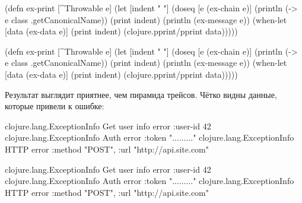 \ifx\DEVICETYPE\MOBILE

\begin{english}
  \begin{clojure}
(defn ex-print
  [^Throwable e]
  (let [indent "  "]
    (doseq [e (ex-chain e)]
      (println (-> e
                   class
                   .getCanonicalName))
      (print indent)
      (println (ex-message e))
      (when-let [data (ex-data e)]
        (print indent)
        (clojure.pprint/pprint data)))))
  \end{clojure}
\end{english}

\else

\begin{english}
  \begin{clojure}
(defn ex-print
  [^Throwable e]
  (let [indent "  "]
    (doseq [e (ex-chain e)]
      (println (-> e class .getCanonicalName))
      (print indent)
      (println (ex-message e))
      (when-let [data (ex-data e)]
        (print indent)
        (clojure.pprint/pprint data)))))
  \end{clojure}
\end{english}

\fi

Результат выглядит приятнее, чем пирамида трейсов. Чётко видны данные,
которые привели к ошибке:

\ifx\DEVICETYPE\MOBILE

\begin{english}
  \begin{clojure}
clojure.lang.ExceptionInfo
  Get user info error
  {:user-id 42}
clojure.lang.ExceptionInfo
  Auth error
  {:token "........."}
clojure.lang.ExceptionInfo
  HTTP error
  {:method "POST",
   :url "http://api.site.com"}
  \end{clojure}
\end{english}

\else

\begin{english}
  \begin{clojure}
clojure.lang.ExceptionInfo
  Get user info error
  {:user-id 42}
clojure.lang.ExceptionInfo
  Auth error
  {:token "........."}
clojure.lang.ExceptionInfo
  HTTP error
  {:method "POST", :url "http://api.site.com"}
  \end{clojure}
\end{english}

\fi


